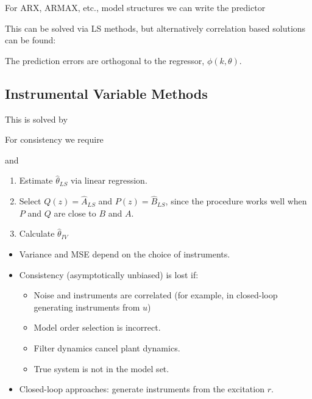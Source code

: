 \documentclass[10pt,a4paper]{scrartcl}
\begin{document}
\begin{multicols*}{2}
For ARX, ARMAX, etc., model structures we can write the predictor


This can be solved via LS methods, but alternatively correlation based solutions can be found:


The prediction errors are orthogonal to the regressor, $\phi(k,\theta)$.

\subsection{Instrumental Variable Methods}


This is solved by


For consistency we require


and 



\begin{enumerate}
\item Estimate $\hat{\theta}_{LS}$ via linear regression.
\item Select $Q(z)=\hat{A}_{LS}$ and $P(z)=\hat{B}_{LS}$, since the procedure works well when $P$ and $Q$ are close to $B$ and $A$.
\item Calculate $\hat{\theta}_{IV}$
\end{enumerate}

\begin{itemize}
\item Variance and MSE depend on the choice of instruments.
\item Consistency (asymptotically unbiased) is lost if:
\begin{itemize}
\item Noise and instruments are correlated (for example, in closed-loop generating instruments from $u$)
\item Model order selection is incorrect.
\item Filter dynamics cancel plant dynamics.
\item True system is not in the model set.
\end{itemize}
\item Closed-loop approaches: generate instruments from the excitation $r$.
\end{itemize}


\end{multicols*}
\end{document}
